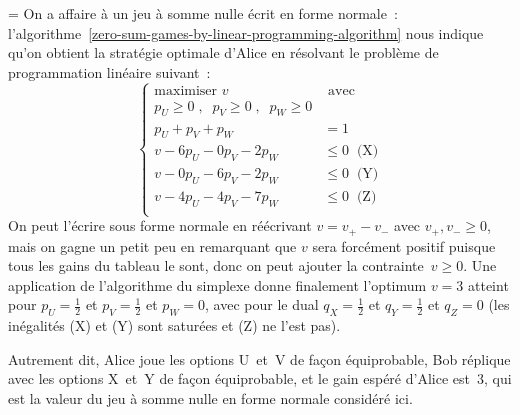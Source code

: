 \documentclass[12pt,a4paper]{article}
\theoremstyle{definition}
\newif\ifcorrige
\newenvironment{corrige}%
{\ifcorrige\relax\else\setbox0=\vbox\bgroup\fi%
\smallbreak\noindent{\underbar{\textit{Corrigé.}}\quad}}
{{\hbox{}\nobreak\hfill\checkmark}%
\ifcorrige\relax\else\egroup\fi\par}
\begin{document}
\begin{corrige}
On a affaire à un jeu à somme nulle écrit en forme normale :
l'algorithme \ref{zero-sum-games-by-linear-programming-algorithm} nous
indique qu'on obtient la stratégie optimale d'Alice en résolvant le
problème de programmation linéaire suivant :
\[
\left\{
\begin{aligned}
\text{maximiser\ }v&\text{\ avec}\\
p_U \geq 0\;, \;\; p_V \geq 0\;, \;\; p_W \geq 0&\\
p_U + p_V + p_W &= 1\\
v - 6p_U - 0p_V - 2p_W &\leq 0\;\;\text{(X)}\\
v - 0p_U - 6p_V - 2p_W &\leq 0\;\;\text{(Y)}\\
v - 4p_U - 4p_V - 7p_W &\leq 0\;\;\text{(Z)}\\
\end{aligned}
\right.
\]
On peut l'écrire sous forme normale en réécrivant $v = v_+ - v_-$ avec
$v_+,v_- \geq 0$, mais on gagne un petit peu en remarquant que $v$
sera forcément positif puisque tous les gains du tableau le sont, donc
on peut ajouter la contrainte $v \geq 0$.  Une application de
l'algorithme du simplexe donne finalement l'optimum $v = 3$ atteint
pour $p_U = \frac{1}{2}$ et $p_V = \frac{1}{2}$ et $p_W = 0$, avec
pour le dual $q_X = \frac{1}{2}$ et $q_Y = \frac{1}{2}$ et $q_Z = 0$
(les inégalités (X) et (Y) sont saturées et (Z) ne l'est pas).

Autrement dit, Alice joue les options U et V de façon équiprobable,
Bob réplique avec les options X et Y de façon équiprobable, et le gain
espéré d'Alice est $3$, qui est la valeur du jeu à somme nulle en
forme normale considéré ici.
\end{corrige}

\smallbreak
\end{document}
